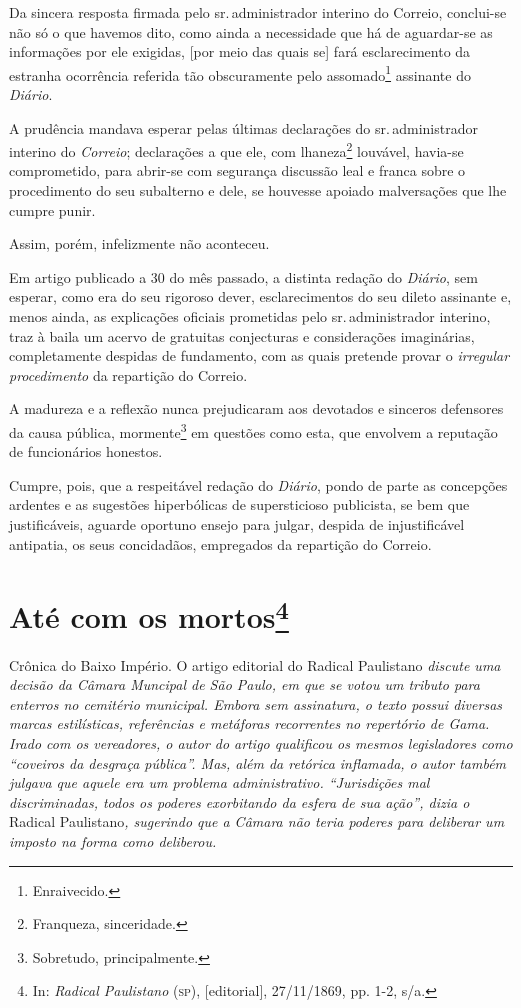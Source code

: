 Da sincera resposta firmada pelo sr.\,administrador interino do Correio,
conclui-se não só o que havemos dito, como ainda a necessidade que há de
aguardar-se as informações por ele exigidas, {[}por meio das quais se{]}
fará esclarecimento da estranha ocorrência referida tão obscuramente
pelo assomado\footnote{Enraivecido.} assinante do \emph{Diário}.

A prudência mandava esperar pelas últimas declarações do sr.\,administrador interino do \emph{Correio}; declarações a que ele, com
lhaneza\footnote{Franqueza, sinceridade.} louvável, havia-se
comprometido, para abrir-se com segurança discussão leal e franca sobre
o procedimento do seu subalterno e dele, se houvesse apoiado
malversações que lhe cumpre punir.

Assim, porém, infelizmente não aconteceu.

Em artigo publicado a 30 do mês passado, a distinta redação do
\emph{Diário}, sem esperar, como era do seu rigoroso dever,
esclarecimentos do seu dileto assinante e, menos ainda, as explicações
oficiais prometidas pelo sr.\,administrador interino, traz à baila um
acervo de gratuitas conjecturas e considerações imaginárias,
completamente despidas de fundamento, com as quais pretende provar o
\emph{irregular procedimento} da repartição do Correio.

A madureza e a reflexão nunca prejudicaram aos devotados e sinceros
defensores da causa pública, mormente\footnote{Sobretudo,
  principalmente.} em questões como esta, que envolvem a reputação de
funcionários honestos.

Cumpre, pois, que a respeitável redação do \emph{Diário}, pondo de parte
as concepções ardentes e as sugestões hiperbólicas de supersticioso
publicista, se bem que justificáveis, aguarde oportuno ensejo para
julgar, despida de injustificável antipatia, os seus concidadãos,
empregados da repartição do Correio.

\chapter{Até com os mortos\footnote{In: \emph{Radical Paulistano} (\textsc{sp}),
  {[}editorial{]}, 27/11/1869, pp. 1-2, s/a.}}

\begin{didascalia}
Crônica do Baixo Império. O artigo editorial do Radical Paulistano
\emph{discute uma decisão da Câmara Muncipal de São Paulo, em que se
votou um tributo para enterros no cemitério municipal. Embora sem
assinatura, o texto possui diversas marcas estilísticas, referências e
metáforas recorrentes no repertório de Gama. Irado com os vereadores, o
autor do artigo qualificou os mesmos legisladores como ``coveiros da
desgraça pública''. Mas, além da retórica inflamada, o autor também
julgava que aquele era um problema administrativo. ``Jurisdições mal
discriminadas, todos os poderes exorbitando da esfera de sua ação'',
dizia o} Radical Paulistano\emph{, sugerindo que a Câmara não teria
poderes para deliberar um imposto na forma como deliberou.}
\end{didascalia}




